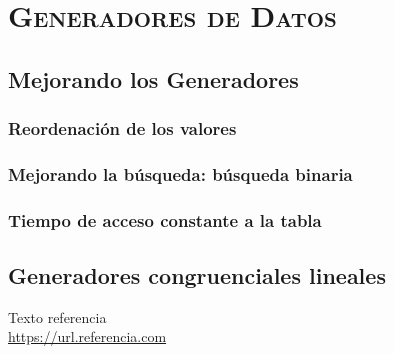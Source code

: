 \documentclass[11pt,a4paper]{report}
\begin{document}
\newpage

\chapter{\textsc{Generadores de Datos}}

\section{Mejorando los Generadores}

\subsection{Reordenación de los valores}

\subsection{Mejorando la búsqueda: búsqueda binaria}

\subsection{Tiempo de acceso constante a la tabla}

\section{Generadores congruenciales lineales}

\newpage

\begin{thebibliography}{5}

Texto referencia
\\\url{https://url.referencia.com}

\end{thebibliography}
\end{document}
